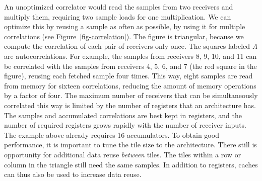 \documentclass{article}
\begin{document}
An unoptimized correlator would read the samples from two receivers and
multiply them, requiring two sample loads for one multiplication.
We can optimize this by reusing a sample 
as often as possible, by using it for multiple correlations (see
Figure~\ref{fig-correlation}).
The figure is triangular, because we compute
the correlation of each pair of receivers only once. The squares labeled \emph{A} are
autocorrelations.
For example, the samples from receivers 8, 9, 10, and 11 can be correlated
with the samples from receivers 4, 5, 6, and 7 (the red square in the figure),
reusing each fetched sample four times.
This way, eight samples are read from memory for sixteen
correlations, reducing the amount of memory operations by a factor
of four.
The maximum number of receivers that can
be simultaneously correlated this way is limited by the number of registers that an architecture has.
The samples and accumulated correlations are best kept in registers, and the number of
required registers grows rapidly with the number of receiver inputs.
The example above already requires 16 accumulators.
To obtain good performance, it is important to tune the tile size to the
architecture.
There still is
opportunity for additional data reuse \emph{between} tiles.  The tiles
within a row or column in the triangle still need the same samples.
In addition to registers, caches can thus also be used to increase
data reuse. 

\end{document}
